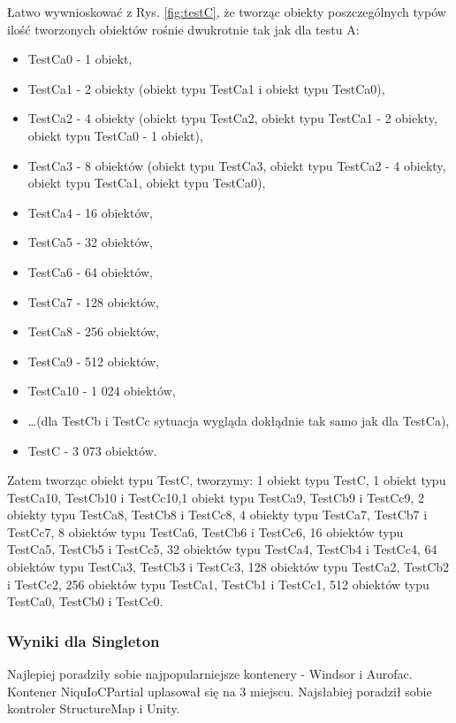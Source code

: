 \documentclass[12pt]{article}
\begin{document}
Łatwo wywnioskować z Rys. \ref{fig:testC}, że tworząc obiekty poszczególnych typów ilość tworzonych obiektów rośnie dwukrotnie tak jak dla testu A:
\begin{itemize}
	\item TestCa0 - 1 obiekt,
	\item TestCa1 - 2 obiekty (obiekt typu TestCa1 i obiekt typu TestCa0),
	\item TestCa2 - 4 obiekty (obiekt typu TestCa2, obiekt typu TestCa1 - 2 obiekty, obiekt typu TestCa0 - 1 obiekt),
	\item TestCa3 - 8 obiektów (obiekt typu TestCa3, obiekt typu TestCa2 - 4 obiekty, obiekt typu TestCa1, obiekt typu TestCa0),
	\item TestCa4 - 16 obiektów,
	\item TestCa5 - 32 obiektów,
	\item TestCa6 - 64 obiektów,
	\item TestCa7 - 128 obiektów,
	\item TestCa8 - 256 obiektów,
	\item TestCa9 - 512 obiektów,
	\item TestCa10 - 1 024 obiektów,
	\item \ldots (dla TestCb i TestCc sytuacja wygląda dokłądnie tak samo jak dla TestCa),
	\item TestC - 3 073 obiektów.
\end{itemize}
Zatem tworząc obiekt typu TestC, tworzymy: 1 obiekt typu TestC, 1 obiekt typu TestCa10, TestCb10 i TestCc10,1 obiekt typu TestCa9, TestCb9 i TestCc9, 2 obiekty typu TestCa8, TestCb8 i TestCc8, 4 obiekty typu TestCa7, TestCb7 i TestCc7, 8 obiektów typu TestCa6, TestCb6 i TestCc6, 16 obiektów typu TestCa5, TestCb5 i TestCc5, 32 obiektów typu TestCa4, TestCb4 i TestCc4, 64 obiektów typu TestCa3, TestCb3 i TestCc3, 128 obiektów typu TestCa2, TestCb2 i TestCc2, 256 obiektów typu TestCa1, TestCb1 i TestCc1, 512 obiektów typu TestCa0, TestCb0 i TestCc0.

\subsubsection{Wyniki dla Singleton}
Najlepiej poradziły sobie najpopularniejsze kontenery - Windsor i Aurofac. Kontener NiquIoCPartial uplasował się na 3 miejscu. Najsłabiej poradził sobie kontroler StructureMap i Unity.
\end{document}
